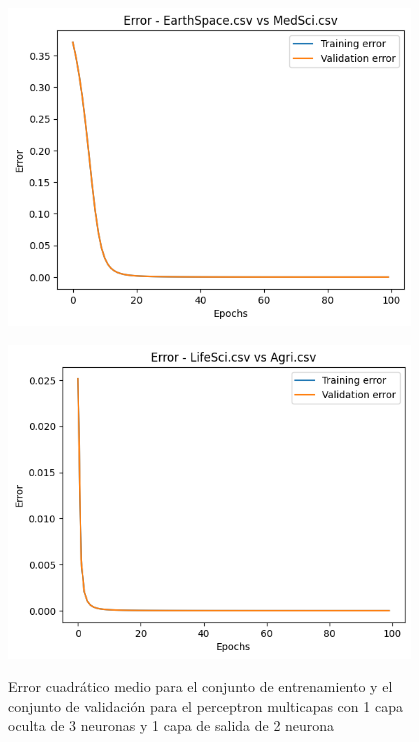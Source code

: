 \documentclass{article}
\theoremstyle{mytheoremstyle}
\theoremstyle{mytheoremstyle}
\theoremstyle{myproblemstyle}
\begin{document}
\begin{figure}[!h]
  \begin{minipage}[b]{0.45\textwidth}
    \centering
    \includegraphics[width=0.95\textwidth]{./img/output.png}
    \label{fig:1}

  \end{minipage}
  \begin{minipage}[b]{0.45\textwidth}
    \centering
    \includegraphics[width=0.95\textwidth]{./img/output2.png}
    \label{fig:2}
  \end{minipage}
  \caption{Error cuadrático medio para el conjunto de entrenamiento y el conjunto de validación para el perceptron multicapas con 1 capa oculta de 3 neuronas y 1 capa de salida de 2 neurona}
\end{figure}
\end{document}
